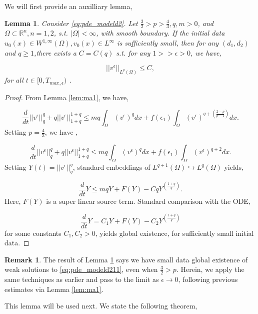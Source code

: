 \documentclass[10pt]{amsart}
\theoremstyle{plain}
\newtheorem{lemma}[theorem]{Lemma}
\theoremstyle{definition}
\newtheorem{remark}{Remark}
\begin{document}
We will first provide an auxilliary lemma,

\begin{lemma}
\label{lem:l1e}
Consider \eqref{eq:pde_modeld2}. Let $\frac{3}{2} > p > \frac{4}{3}, q,m>0$, and $\Omega \subset \mathbb{R}^{n}, n=1,2$, s.t. $|\Omega| < \infty$, with smooth boundary. If the initial data $u_{0}(x) \in W^{1,\infty}(\Omega), v_{0}(x) \in L^{\infty}$ is sufficiently small, then for any $(d_{1},d_{2})$ and $q \geq 1$,there exists a $C=C(q)$ s.t. for any $1>>\epsilon > 0$, we have,

\begin{equation}
    ||v^{\epsilon}||_{L^{q}(\Omega)} \leq C,
\end{equation}
  for all $t \in [0, T_{max, \epsilon})$  .
\end{lemma}

\begin{proof}
From Lemma \ref{lem:ma1}, we have,


\begin{equation}
 \frac{d}{dt}||v^{\epsilon}||^{q}_{q} 
+q||v^{\epsilon}||^{1+q}_{1+q} 
 \leq mq\int_{\Omega} (v^{\epsilon})^{q}dx +  f(\epsilon_{1})\int_{\Omega} (v^{\epsilon})^{q + \left(\frac{2-p}{p-1}\right)}dx.
\end{equation}
Setting $p=\frac{4}{3}$, we have ,

\begin{equation}
 \frac{d}{dt}||v^{\epsilon}||^{q}_{q} 
+q||v^{\epsilon}||^{1+q}_{1+q} 
 \leq mq\int_{\Omega} (v^{\epsilon})^{q}dx +  f(\epsilon_{1})\int_{\Omega} (v^{\epsilon})^{q+2}dx.
\end{equation}
Setting $Y(t)=||v^{\epsilon}||^{q}_{q}$, standard embeddings of $L^{q+1}(\Omega) \hookrightarrow L^{q}(\Omega)$ yields,

\begin{equation}
 \frac{d}{dt}Y \leq mq Y + F(Y) - CqY^{\left(\frac{1+q}{q}\right)}.
\end{equation}
%
Here, $F(Y)$ is a super linear source term. Standard comparison with the ODE,

\begin{equation}
 \frac{d}{dt}Y = C_{1} Y + F(Y) - C_{2} Y^{\left(\frac{1+q}{q}\right)}
\end{equation}
%
for some constants $C_{1},C_{2}>0$, yields global existence, for sufficiently small initial data. 
\end{proof}

\begin{remark}
The result of Lemma \ref{lem:l1e} says we have small data global existence of weak solutions to \eqref{eq:pde_modeld211}, even when $\frac{3}{2} > p $. Herein, we apply the same techniques as earlier and pass to the limit as $\epsilon \rightarrow 0$, following previous estimates via Lemma \ref{lem:ma1}.
\end{remark}
This lemma will be used next. We state the following theorem,
\end{document}

